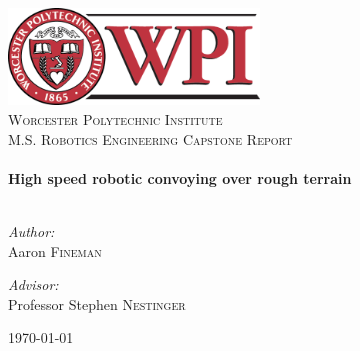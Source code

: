\begin{titlepage}
\begin{center}

\includegraphics[width=0.5\textwidth]{figures/wpi_logo.png}\\[1cm]

\textsc{\LARGE Worcester Polytechnic Institute}\\[1.5cm]

\textsc{\Large M.S. Robotics Engineering Capstone Report}\\[0.5cm]



\HRule \\[0.4cm]
{\huge\bfseries High speed robotic convoying over rough terrain}\\[0.4cm]

\HRule \\[1.5cm]


\begin{minipage}{0.35\textwidth}
\begin{flushleft}\large\emph{Author:}\\
Aaron \textsc{Fineman}
\end{flushleft}
\end{minipage}
\begin{minipage}{0.55\textwidth}
\begin{flushright}\large
\emph{Advisor:}\\
Professor Stephen \textsc{Nestinger}
\end{flushright}
\end{minipage}

\vfill


{\large\today}

\end{center}
\end{titlepage}

